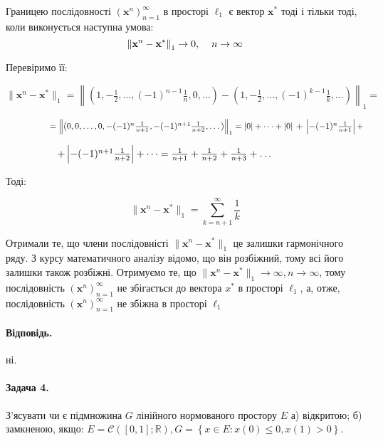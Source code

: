 \documentclass[a5paper, 20pt, titlepage]{article}
\newcommand{\x}{\textbf{x}}
\begin{document}
Границею послідовності $(\x^n)_{n=1}^{\infty}$ в просторі $\ell_1$ є вектор $\x^*$ тоді і тільки тоді, коли виконується наступна умова: 
$$ \left\| \x^n - \x^* \right\|_{1} \to 0, \hspace{4mm} n \to \infty$$

Перевіримо її:

\vspace{2mm}
$\| \x^n - \x^* \|_{1} = \left\| (1, -\frac{1}{2}, \dots, (-1)^{n-1}\frac{1}{n}, 0, \dots) - (1, -\frac{1}{2}, \dots,  (-1)^{k-1}\frac{1}{k}, \dots ) \right\|_1 = $

\vspace{3mm}

$\hspace{18mm}  = \left\|(0, 0, \dots, 0, -(-1)^n \frac{1}{n+1}, -(-1)^{n+1} \frac{1}{n+2}, \dots) \right\|_1 = |0| + \dots + |0| \, + \, \left| -(-1)^n \frac{1}{n+1} \right| + $

\vspace{3mm}

$\hspace{18mm} + \left|-(-1)^{n+1} \frac{1}{n+2}\right| + \dots = \frac{1}{n+1} + \frac{1}{n+2} + \frac{1}{n+3} + \dots$ 

\vspace{4mm}

\vspace{3mm}

Тоді:

$$ \| \x^n - \x^* \|_{1} = \sum \limits_{k = n+1}^\infty \frac{1}{k}$$

Отримали те, що члени послідовністі $\| \x^n - \x^* \|_{1}$ це залишки гармонічного ряду. З курсу математичного аналізу відомо, що він розбіжний, тому всі його залишки також розбіжні. Отримуємо те, що  \newline $\| \x^n - \x^* \|_{1} \to \infty, n \to \infty$, тому послідовність $(\x^n)_{n=1}^{\infty}$ не збігається до вектора $x^*$ в просторі $\ell_1$, а, отже, послідовність  $(\x^n)_{n=1}^{\infty}$ не збіжна в просторі $\ell_1$
\vspace{4mm}
\paragraph{Відповідь.} ні.


\vspace{7mm}

\paragraph{Задача 4.} \hfill \nolinebreak З'ясувати чи є підмножина $G$ лінійного нормованого простору $E$ а) відкритою; б) замкненою, якщо: $E = \mathcal{C} \left( [0, 1]; \mathbb{R} \right), G = \left\{ x \in E: x(0) \leqslant 0, x(1) > 0 \right\}$. 
\end{document}
